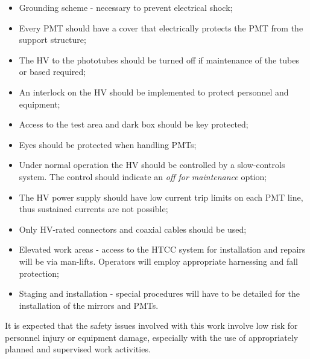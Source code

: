 \begin{itemize}

\item Grounding scheme - necessary to prevent electrical shock;

\item Every PMT should have a cover that electrically protects the PMT  
from the support structure;

\item The HV to the phototubes should be turned off if maintenance of 
the tubes or based required;

\item An interlock on the HV should be implemented to protect personnel and 
equipment;

\item Access to the test area and dark box should be key protected;

\item Eyes should be protected when handling PMTs;

\item Under normal operation the HV should be controlled by a slow-controls 
system.  The control should indicate an {\it off for maintenance} option;

\item The HV power supply should have low current trip limits on each PMT 
line, thus sustained currents are not possible;

\item Only HV-rated connectors and coaxial cables should be used;
 
\item Elevated work areas - access to the HTCC system for installation
and repairs will be via man-lifts.  Operators will employ appropriate
harnessing and fall protection;

\item Staging and installation - special procedures will have to be 
detailed for the installation of the mirrors and PMTs.

\end{itemize}

It is expected that the safety issues involved with this work involve
low risk for personnel injury or equipment damage, especially with the
use of appropriately planned and supervised work activities.
